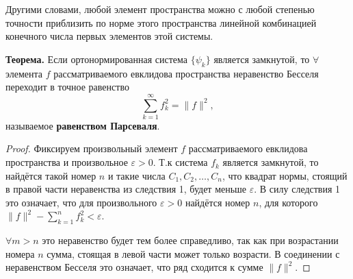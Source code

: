 Другими словами, любой элемент пространства можно с любой степенью точности приблизить по норме этого пространства линейной комбинацией конечного числа первых элементов этой системы.

\textbf{Теорема.} Если ортонормированная система $\{\psi_k\}$ является замкнутой, то $\forall$ элемента $f$ рассматриваемого евклидова пространства неравенство Бесселя переходит в точное равенство
$$\displaystyle\sum_{k=1}^{\infty}f_k^2= \| f  \|^2,$$ называемое \textbf{равенством Парсеваля}.

\begin{proof}
Фиксируем произвольный элемент $f$ рассматриваемого евклидова пространства и произвольное $\varepsilon > 0$. 
Т.к система $f_k$ является замкнутой, то найдётся такой номер $n$ и такие числа $C_1, C_2, \dots, C_n$, что квадрат нормы, стоящий в правой части неравенства из следствия 1, будет меньше $\varepsilon$. В силу следствия 1 это означает, что для произвольного $\varepsilon > 0$ найдётся номер $n$, для которого
$ \| f  \|^2- \displaystyle\sum_{k=1}^{n}f_k^2 < \varepsilon$.

$\forall m > n$ это неравенство будет тем более справедливо, так как при возрастании номера $n$ сумма, стоящая в левой части может только возрасти.
В соединении с неравенством Бесселя это означает, что ряд  сходится к сумме $ \| f \|^2$.
\end{proof}

